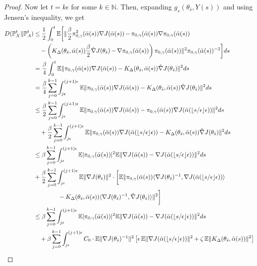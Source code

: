\documentclass[journal,onecolumn]{IEEEtran}
\newcommand{\step}{\epsilon}
\newcommand{\grad}{\nabla}
\newcommand{\gradn}{\hat{\nabla}}
\newcommand{\rew}{J}
\newcommand{\CE}{\mathbb{E}}
\newcommand{\alsbar}{\bar{\alpha}(s)}
\newcommand{\sbar}{\bar{s}}
\newcommand{\lawXt}{\mathbb{P}_X^t}
\newcommand{\lawAt}{\mathbb{P}_A^t}
\newcommand{\KL}{D}
\newcommand{\K}{K}
\newcommand{\Kd}{\K_{\Delta}}
\newcommand{\alsebar}{\bar{\alpha}(\lfloor s / \step \rfloor \step)}
\newcommand{\N}{\mathbb{N}}
\newcommand{\ids}{\pi}
\newcommand{\idw}{\gamma}
\newcommand{\isp}{0,\idw}
\newcommand{\gradnvar}{\zeta}
\newcommand{\idistrw}{\ids_{\isp}}
\begin{document}
{\begin{proof}
Now let $t = k\step$ for some $k \in \N$. Then, expanding $g_s(\theta_{\sbar}, Y(s))$ and using Jensen's inequality, we get
{\color{black}
\begin{align}
\begin{split}
\label{eq:KL_bound}
\KL(\lawXt \| \lawAt) &\leq \frac{1}{2} \int_0^t \CE \biggl[ \| \frac{\beta}{2}\idistrw^2(\alsbar)\grad\rew(\alsbar) \,\color{black}{-}\, \idistrw(\alsbar) \grad \idistrw(\alsbar)\\ & \quad - \left(\Kd(\theta_{\sbar},\alsbar)\frac{\beta}{2}\gradn \rew(\theta_{\sbar}) \,\color{black}{-}\, \grad\idistrw(\alsbar)\right)\idistrw(\alsbar) \|^2 \idistrw(\alsbar)^{-2}\biggr] ds \\
    & =  \frac{\beta}{4} \int_0^t \CE  \| \idistrw(\alsbar)\grad \rew(\alsbar)  - \Kd(\theta_{\sbar},\alsbar)\gradn \rew(\theta_{\sbar}) \|^2 ds \\
 &= \frac{\beta}{4} \sum_{j=0}^{k-1}\int_{j\step}^{(j+1)\step} \CE  \| \idistrw(\alsbar)\grad \rew(\alsbar) - \Kd(\theta_{\sbar},\alsbar)\gradn \rew(\theta_{\sbar}) \|^2 ds \\
&\leq \frac{\beta}{2} \sum_{j=0}^{k-1} \int_{j\step}^{(j+1)\step} \CE \|\idistrw(\alsbar)\grad \rew(\alsbar) - \idistrw(\alsbar)\grad\rew(\alsebar)\|^2 ds \\
 &\quad  + \frac{\beta}{2} \sum_{j=0}^{k-1} \int_{j\step}^{(j+1)\step} \CE \| \idistrw(\alsbar)\grad\rew(\alsebar) - \Kd(\theta_{\sbar},\alsbar)\gradn \rew(\theta_{\sbar})\|^2 ds \\
 &\leq  \beta \sum_{j=0}^{k-1} \int_{j\step}^{(j+1)\step} \CE|\idistrw(\alsbar)|^2\CE \|\grad \rew(\alsbar) - \grad\rew(\alsebar)\|^2 ds \\
 \quad &+ \frac{\beta}{2} \sum_{j=0}^{k-1} \int _{j\step}^{(j+1)\step} \CE\|\grad\rew(\theta_{\sbar})\|^2 \cdot \biggl[\CE\|\idistrw(\alsbar)\langle \grad\rew(\theta_{\sbar})^{-1}, \grad\rew(\alsebar) \rangle  \\&\quad \quad \quad \quad - \Kd(\theta_{\sbar},\alsbar)\langle \grad\rew(\theta_{\sbar})^{-1}, \gradn\rew(\theta_{\sbar})\rangle 
 \|^2\biggr] \\
 &\leq  \beta \sum_{j=0}^{k-1} \int_{j\step}^{(j+1)\step} \CE|\idistrw(\alsbar)|^2\CE \|\grad \rew(\alsbar) - \grad\rew(\alsebar)\|^2 ds\\
 &\quad  + \beta \sum_{j=0}^{k-1} \int _{j\step}^{(j+1)\step} C_0  \cdot \CE\|\grad\rew(\theta_{\sbar})^{-1}\|^2 \left[ \step\,\CE\| \grad\rew(\alsebar)\|^2 +\gradnvar \, \CE\|\Kd(\theta_{\sbar},\alsbar) \|^2\right] \\

\end{split}
\end{align}}
\end{proof}}
\end{document}
